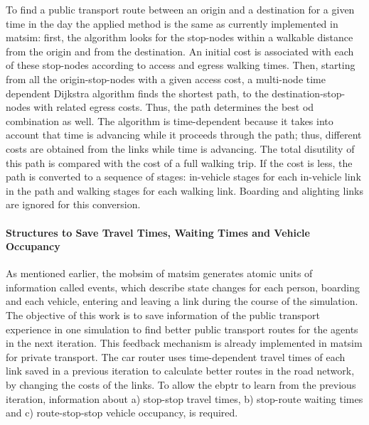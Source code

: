 To find a public transport route between an origin and a destination for a given time in the day the applied method is the same as currently implemented in \gls{matsim}: first, the algorithm looks for the stop-nodes within a walkable distance from the origin and from the destination. An initial cost is associated with each of these stop-nodes according to access and egress walking times. Then, starting from all the origin-stop-nodes with a given access cost, a multi-node time dependent Dijkstra algorithm finds the shortest path, to the destination-stop-nodes with related egress costs. Thus, the path determines the best \gls{od} combination as well. The algorithm is time-dependent because it takes into account that time is advancing while it proceeds through the path; thus, different costs are obtained from the links while time is advancing. The total disutility of this path is compared with the cost of a full walking trip. If the cost is less, the path is converted to a sequence of stages: in-vehicle stages for each in-vehicle link in the path and walking stages for each walking link. Boarding and alighting links are ignored for this conversion.

\paragraph{Structures to Save Travel Times, Waiting Times and Vehicle Occupancy} 
\label{subsec:Structures}

As mentioned earlier, the \gls{mobsim} of \gls{matsim} generates atomic units of information called \glspl{event}, which describe state changes for each person, \eg boarding and each vehicle, \eg entering and leaving a link during the course of the simulation. The objective of this work is to save information of the public transport experience in one simulation to find better public transport routes for the agents in the next iteration. This feedback mechanism is already implemented in \gls{matsim} for private transport. The car router uses time-dependent travel times of each link saved in a previous iteration to calculate better routes in the road network, by changing the costs of the links. To allow the \gls{ebptr} to learn from the previous iteration, information about a) stop-stop travel times, b) stop-route waiting times and c) route-stop-stop vehicle occupancy, is required.

